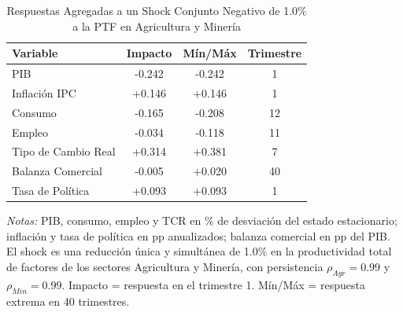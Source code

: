 \begin{table}[htbp]
\centering
\caption{Respuestas Agregadas a un Shock Conjunto Negativo de 1.0\% a la PTF en Agricultura y Minería}
\label{tab:agrmin_agg}
\begin{threeparttable}
\begin{tabular}{@{}l c c c@{}}
\toprule
Variable & Impacto & Mín/Máx & Trimestre \\
\midrule
PIB & -0.242 & -0.242 & 1 \\
Inflación IPC & +0.146 & +0.146 & 1 \\
Consumo & -0.165 & -0.208 & 12 \\
Empleo & -0.034 & -0.118 & 11 \\
Tipo de Cambio Real & +0.314 & +0.381 & 7 \\
Balanza Comercial & -0.005 & +0.020 & 40 \\
Tasa de Política & +0.093 & +0.093 & 1 \\
\bottomrule
\end{tabular}
\begin{tablenotes}[flushleft]
\footnotesize
\item \textit{Notas:} PIB, consumo, empleo y TCR en \% de desviación del estado estacionario; inflación y tasa de política en pp anualizados; balanza comercial en pp del PIB. El shock es una reducción única y simultánea de 1.0\% en la productividad total de factores de los sectores Agricultura y Minería, con persistencia $\rho_{Agr} = 0.99$ y $\rho_{Min} = 0.99$. Impacto = respuesta en el trimestre 1. Mín/Máx = respuesta extrema en 40 trimestres.
\end{tablenotes}
\end{threeparttable}
\end{table}
